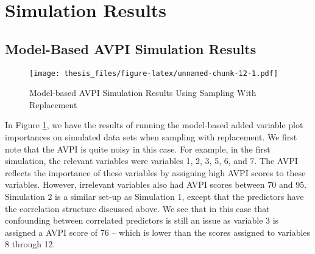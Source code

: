 \documentclass[12pt,twoside]{reedthesis}
\theoremstyle{definition}
\theoremstyle{definition}
\theoremstyle{definition}
\theoremstyle{remark}
\begin{document}
\section{Simulation Results}\label{simulation-results}

\subsection{Model-Based AVPI Simulation
Results}\label{model-based-avpi-simulation-results}
\begin{figure}
\centering
\texttt{[image: thesis\_files/figure-latex/unnamed-chunk-12-1.pdf]}
\caption{\label{fig:unnamed-chunk-12}\label{AVPIwrep}Model-based AVPI
Simulation Results Using Sampling With Replacement}
\end{figure}
In Figure \ref{AVPIwrep}, we have the results of running the model-based
added variable plot importances on simulated data sets when sampling
with replacement. We first note that the AVPI is quite noisy in this
case. For example, in the first simulation, the relevant variables were
variables 1, 2, 3, 5, 6, and 7. The AVPI reflects the importance of
these variables by assigning high AVPI scores to these variables.
However, irrelevant variables also had AVPI scores between 70 and 95.
Simulation 2 is a similar set-up as Simulation 1, except that the
predictors have the correlation structure discussed above. We see that
in this case that confounding between correlated predictors is still an
issue as variable 3 is assigned a AVPI score of 76 -- which is lower
than the scores assigned to variables 8 through 12. \par
\end{document}
